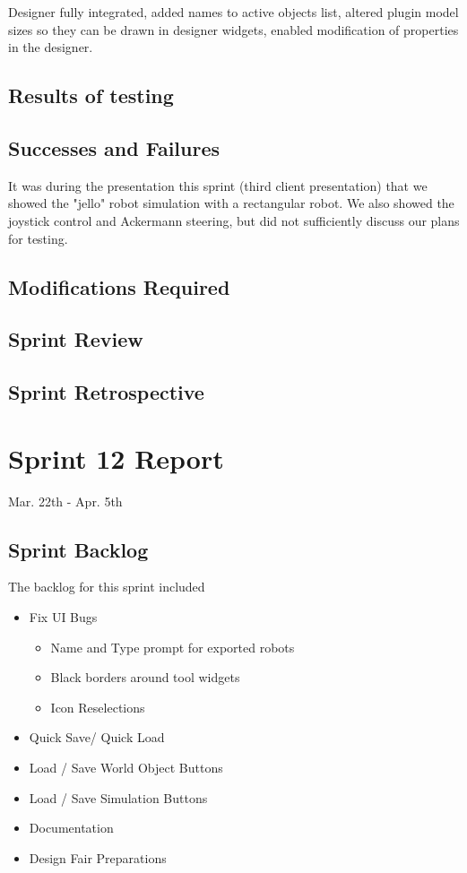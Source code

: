 Designer fully integrated, added names to active objects list, altered plugin model sizes so they can be drawn in designer widgets, enabled modification of properties in the designer. 

\subsection{Results of testing}


\subsection{Successes and Failures}

It was during the presentation this sprint (third client presentation) that we showed the "jello" robot simulation with a rectangular robot. We also showed the joystick control and Ackermann steering, but did not sufficiently discuss our plans for testing.

\subsection{Modifications Required}


\subsection{Sprint Review}


\subsection{Sprint Retrospective}
\section{Sprint 12 Report}
Mar. 22th - Apr. 5th
\subsection{Sprint Backlog}

The backlog for this sprint included 

\begin{itemize}
	\item Fix UI Bugs
	\begin{itemize}
		\item Name and Type prompt for exported robots
		\item Black borders around tool widgets
		\item Icon Reselections
	\end{itemize}
	\item Quick Save/ Quick Load
	\item Load / Save World Object Buttons
	\item Load / Save Simulation Buttons
	\item Documentation
	\item Design Fair Preparations
\end{itemize}

